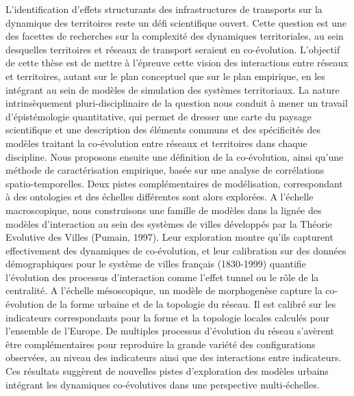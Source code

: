 L'identification d'effets structurants des infrastructures de transports sur la dynamique des territoires reste un défi scientifique ouvert. Cette question est une des facettes de recherches sur la complexité des dynamiques territoriales, au sein desquelles territoires et réseaux de transport seraient en co-évolution. L'objectif de cette thèse est de mettre à l'épreuve cette vision des interactions entre réseaux et territoires, autant sur le plan conceptuel que sur le plan empirique, en les intégrant au sein de modèles de simulation des systèmes territoriaux. La nature intrinsèquement pluri-disciplinaire de la question nous conduit à mener un travail d'épistémologie quantitative, qui permet de dresser une carte du paysage scientifique et une description des éléments communs et des spécificités des modèles traitant la co-évolution entre réseaux et territoires dans chaque discipline. Nous proposons ensuite une définition de la co-évolution, ainsi qu'une méthode de caractérisation empirique, basée sur une analyse de corrélations spatio-temporelles. Deux pistes complémentaires de modélisation, correspondant à des ontologies et des échelles différentes sont alors explorées. A l'échelle macroscopique, nous construisons une famille de modèles dans la lignée des modèles d'interaction au sein des systèmes de villes développés par la Théorie Evolutive des Villes (Pumain, 1997). Leur exploration montre qu'ils capturent effectivement des dynamiques de co-évolution, et leur calibration sur des données démographiques pour le système de villes français (1830-1999) quantifie l'évolution des processus d'interaction comme l'effet tunnel ou le rôle de la centralité. A l'échelle mésoscopique, un modèle de morphogenèse capture la co-évolution de la forme urbaine et de la topologie du réseau. Il est calibré sur les indicateurs correspondants pour la forme et la topologie locales calculés pour l'ensemble de l'Europe. De multiples processus d'évolution du réseau s'avèrent être complémentaires pour reproduire la grande variété des configurations observées, au niveau des indicateurs ainsi que des interactions entre indicateurs. Ces résultats suggèrent de nouvelles pistes d'exploration des modèles urbains intégrant les dynamiques co-évolutives dans une perspective multi-échelles.








\newpage

